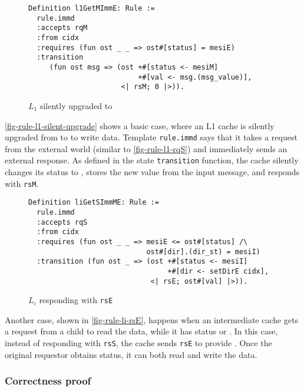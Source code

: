 \documentclass[sigplan,10pt,review,anonymous,screen]{acmart}\settopmatter{printfolios=true,printccs=false,printacmref=false}
\def\slstinline{\lstinline[basicstyle=\ttfamily\small]}
\begin{document}
\begin{figure}[h]
  \centering
\begin{lstlisting}
Definition l1GetMImmE: Rule :=
  rule.immd
  :accepts rqM
  :from cidx
  :requires (fun ost _ _ => ost#[status] = mesiE)
  :transition
     (fun ost msg => (ost +#[status <- mesiM]
                          +#[val <- msg.(msg_value)],
                      <| rsM; 0 |>)).
\end{lstlisting}
  \caption{$L_1$ silently upgraded to \stM{}}
  \label{fig-rule-l1-silent-upgrade}
\end{figure}

\autoref{fig-rule-l1-silent-upgrade} shows a basic case, where an L1 cache is silently upgraded from \stE{} to \stM{} to write data.
Template \slstinline{rule.immd} says that it takes a request from the external world (similar to \autoref{fig-rule-l1-rqS}) and immediately sends an external response.
As defined in the state \slstinline{transition} function, the cache silently changes its status to \stM{}, stores the new value from the input message, and responds with \slstinline{rsM}.

\begin{figure}[h]
  \centering
\begin{lstlisting}
Definition liGetSImmME: Rule :=
  rule.immd
  :accepts rqS
  :from cidx
  :requires (fun ost _ _ => mesiE <= ost#[status] /\
                            ost#[dir].(dir_st) = mesiI)
  :transition (fun ost _ => (ost +#[status <- mesiI]
                                 +#[dir <- setDirE cidx],
                             <| rsE; ost#[val] |>)).
\end{lstlisting}
  \caption{$L_i$ responding with \slstinline{rsE}}
  \label{fig-rule-li-rsE}
\end{figure}

Another case, shown in \autoref{fig-rule-li-rsE}, happens when an intermediate cache gets a request from a child to read the data, while it has status \stE{} or \stM{}.
In this case, instead of responding with \slstinline{rsS}, the cache sends \slstinline{rsE} to provide \stE{}.
Once the original requestor obtains \stE{} status, it can both read and write the data.

\subsubsection{Correctness proof}
\label{sec-mesi-proof}
\end{document}
